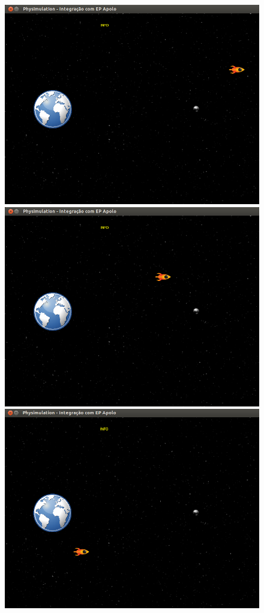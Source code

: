 \begin{figure}[H]
	\includegraphics[scale=0.22]{images/apolo-3.png}
	\includegraphics[scale=0.22]{images/apolo-2.png}
	\includegraphics[scale=0.22]{images/apolo-1.png}

\end{figure}
